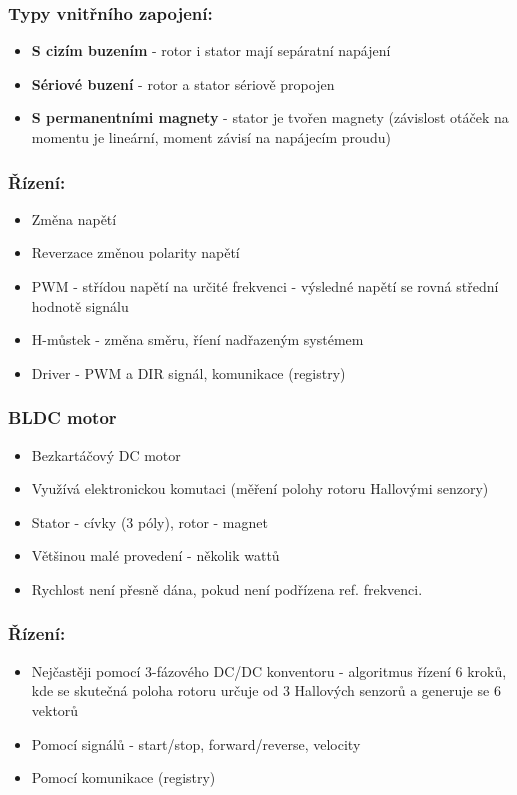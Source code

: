 \subsubsection*{Typy vnitřního zapojení:}
\begin{itemize}
    \item \textbf{S cizím buzením} - rotor i stator mají sepáratní napájení
    \item \textbf{Sériové buzení} - rotor a stator sériově propojen
    \item \textbf{S permanentními magnety} - stator je tvořen magnety (závislost otáček na momentu je lineární, moment závisí na napájecím proudu)
\end{itemize}

\subsubsection*{Řízení:}
\begin{itemize}
    \item Změna napětí
    \item Reverzace změnou polarity napětí
    \item PWM - střídou napětí na určité frekvenci - výsledné napětí se rovná střední hodnotě signálu
    \item H-můstek - změna směru, říení nadřazeným systémem
    \item Driver - PWM a DIR signál, komunikace (registry)
\end{itemize}

\subsubsection*{BLDC motor}
\begin{itemize}
    \item Bezkartáčový DC motor
    \item Využívá elektronickou komutaci (měření polohy rotoru Hallovými senzory)
    \item Stator - cívky (3 póly), rotor - magnet
    \item Většinou malé provedení - několik wattů
    \item Rychlost není přesně dána, pokud není podřízena ref. frekvenci.
\end{itemize}

\subsubsection*{Řízení:}
\begin{itemize}
    \item Nejčastěji pomocí 3-fázového DC/DC konventoru - algoritmus řízení 6 kroků, kde se skutečná poloha rotoru určuje od 3 Hallových senzorů a generuje se 6 vektorů
    \item Pomocí signálů - start/stop, forward/reverse, velocity
    \item Pomocí komunikace (registry)
\end{itemize}

